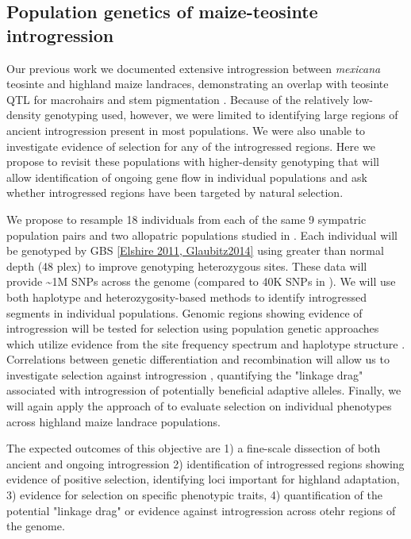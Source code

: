 \subsection{Population genetics of maize-teosinte introgression} \label{subsec:intropopgen}

Our previous work \citep{Hufford2013} we documented extensive introgression between \emph{mexicana} teosinte and highland maize landraces, demonstrating an overlap with teosinte QTL for macrohairs and stem pigmentation \citep{Lauter2004a}. Because of the relatively low-density genotyping used, however, we were limited to identifying large regions of ancient introgression present in most populations.  We were also unable to investigate evidence of selection for any of the introgressed regions.  Here we propose to revisit these populations with higher-density genotyping that will allow identification of ongoing gene flow in individual populations and ask whether introgressed regions have been targeted by natural selection.  

We propose to resample 18 individuals from each of the same 9 sympatric population pairs and two allopatric populations studied in \citet{Hufford2013}. Each individual will be genotyped by GBS \ref{Elshire 2011, Glaubitz2014} using greater than normal depth (48 plex) to improve genotyping heterozygous sites.  These data will provide \textasciitilde 1M SNPs across the genome (compared to 40K SNPs in \citet{Hufford2013}). We will use both haplotype \citep{price2009sensitive} and heterozygosity-based \citep{Geneva2014} methods to identify introgressed segments in individual populations.  Genomic regions showing evidence of introgression will be tested for selection using population genetic approaches which utilize evidence from the site frequency spectrum \citep{nielsen2005genomic} and haplotype structure \citep{voight2006map}.  Correlations between genetic differentiation and recombination will allow us to investigate selection against introgression \citep{Brandvain2013}, quantifying the "linkage drag" associated with introgression of potentially beneficial adaptive alleles.  Finally, we will again apply the approach of \citet{Berg2013} to evaluate selection on individual phenotypes across highland maize landrace populations.

The expected outcomes of this objective are 1) a fine-scale dissection of both ancient and ongoing introgression 2) identification of introgressed regions showing evidence of positive selection, identifying loci important for highland adaptation,  3) evidence for selection on specific phenotypic traits, 4) quantification of the potential "linkage drag" or evidence against introgression across otehr regions of the genome.

